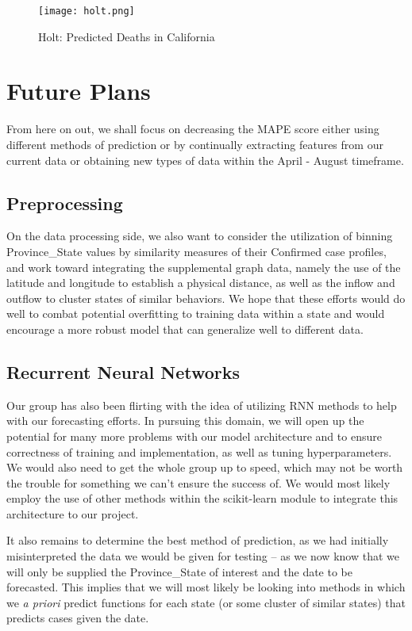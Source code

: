 \documentclass[sigconf]{acmart}
\begin{document}
\begin{figure}
  \centering
  \texttt{[image: holt.png]}
  \caption{Holt: Predicted Deaths in California}
\end{figure}

\section{Future Plans}

From here on out, we shall focus on decreasing the MAPE score either using different methods of prediction or by continually extracting features from our current data or obtaining new types of data within the April - August timeframe.

\subsection{Preprocessing}

On the data processing side, we also want to consider the utilization of binning Province\_State values by similarity measures of their Confirmed case profiles, and work toward integrating the supplemental graph data, namely the use of the latitude and longitude to establish a physical distance, as well as the inflow and outflow to cluster states of similar behaviors. We hope that these efforts would do well to combat potential overfitting to training data within a state and would encourage a more robust model that can generalize well to different data.

\subsection{Recurrent Neural Networks}
Our group has also been flirting with the idea of utilizing RNN methods to help with our forecasting efforts. In pursuing this domain, we will open up the potential for many more problems with our model architecture and to ensure correctness of training and implementation, as well as tuning hyperparameters. We would also need to get the whole group up to speed, which may not be worth the trouble for something we can’t ensure the success of. We would most likely employ the use of other methods within the scikit-learn module to integrate this architecture to our project.
 
It also remains to determine the best method of prediction, as we had initially misinterpreted the data we would be given for testing – as we now know that we will only be supplied the Province\_State of interest and the date to be forecasted. This implies that we will most likely be looking into methods in which we \emph{a priori} predict functions for each state (or some cluster of similar states) that predicts cases given the date.




\end{document}
